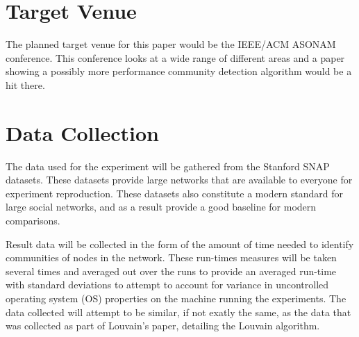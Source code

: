 \documentclass[jair,twoside,11pt,theapa]{article}
\begin{document}
\section{Target Venue}
The planned target venue for this paper would be the IEEE/ACM ASONAM conference. This conference looks at a wide range of different areas and a paper showing a possibly more performance community detection algorithm would be a hit there. 


\section{Data Collection}
The data used for the experiment will be gathered from the Stanford SNAP datasets. These datasets provide large networks that are available to everyone for experiment reproduction. These datasets also constitute a modern standard for large social networks, and as a result provide a good baseline for modern comparisons. 

Result data will be collected in the form of the amount of time needed to identify communities of nodes in the network. These run-times measures will be taken several times and averaged out over the runs to provide an averaged run-time with standard deviations to attempt to account for variance in uncontrolled operating system (OS) properties on the machine running the experiments. The data collected will attempt to be similar, if not exatly the same, as the data that was collected as part of Louvain's paper, detailing the Louvain algorithm.


\vskip 0.2in

\end{document}
